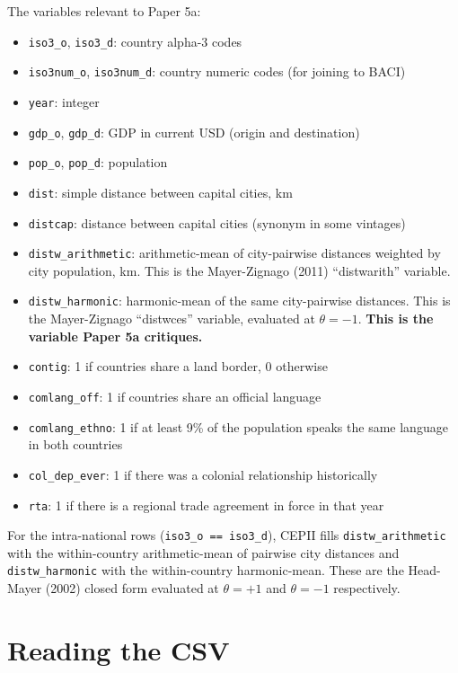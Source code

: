 \documentclass[11pt,letterpaper,oneside]{book}
\theoremstyle{definition}
\theoremstyle{remark}
\begin{document}
The variables relevant to Paper 5a:
\begin{itemize}
  \item \texttt{iso3\_o}, \texttt{iso3\_d}: country alpha-3 codes
  \item \texttt{iso3num\_o}, \texttt{iso3num\_d}: country numeric codes
    (for joining to BACI)
  \item \texttt{year}: integer
  \item \texttt{gdp\_o}, \texttt{gdp\_d}: GDP in current USD (origin and
    destination)
  \item \texttt{pop\_o}, \texttt{pop\_d}: population
  \item \texttt{dist}: simple distance between capital cities, km
  \item \texttt{distcap}: distance between capital cities (synonym in some
    vintages)
  \item \texttt{distw\_arithmetic}: arithmetic-mean of city-pairwise
    distances weighted by city population, km. This is the Mayer-Zignago
    (2011) ``distwarith'' variable.
  \item \texttt{distw\_harmonic}: harmonic-mean of the same city-pairwise
    distances. This is the Mayer-Zignago ``distwces'' variable, evaluated
    at $\theta = -1$. \textbf{This is the variable Paper 5a critiques.}
  \item \texttt{contig}: 1 if countries share a land border, 0 otherwise
  \item \texttt{comlang\_off}: 1 if countries share an official language
  \item \texttt{comlang\_ethno}: 1 if at least 9\% of the population speaks
    the same language in both countries
  \item \texttt{col\_dep\_ever}: 1 if there was a colonial relationship
    historically
  \item \texttt{rta}: 1 if there is a regional trade agreement in force in
    that year
\end{itemize}

For the intra-national rows (\texttt{iso3\_o == iso3\_d}), CEPII fills
\texttt{distw\_arithmetic} with the within-country arithmetic-mean of
pairwise city distances and \texttt{distw\_harmonic} with the
within-country harmonic-mean. These are the Head-Mayer (2002) closed
form evaluated at $\theta = +1$ and $\theta = -1$ respectively.

\section{Reading the CSV}
\end{document}
